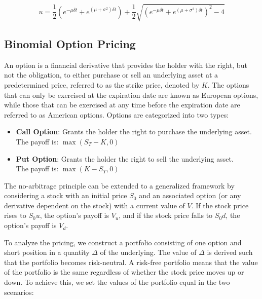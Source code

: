     \begin{equation}
        u = \frac{1}{2} \left( e^{-\mu \delta t} + e^{(\mu + \sigma^2)\delta t} \right)
            + \frac{1}{2} \sqrt{\left( e^{-\mu \delta t} + e^{(\mu + \sigma^2)\delta t} \right)^2 - 4}
        \label{eq:pw_u}
    \end{equation}

    \subsection{Binomial Option Pricing}
        \label{sec:bin_option_pricing}

    An option is a financial derivative that provides the holder with the right, but not the obligation,
    to either purchase or sell an underlying asset at a predetermined price, referred to as the strike price,
    denoted by $K$.
    The options that can only be exercised at the expiration date are known as European options,
    while those that can be exercised at any time before the expiration date are referred to as American options.
    Options are categorized into two types:
    \begin{itemize}
        \item \textbf{Call Option}: Grants the holder the right to purchase the underlying asset. \\
        The payoff is: \( \max(S_T - K, 0) \)
        \item \textbf{Put Option}: Grants the holder the right to sell the underlying asset. \\
        The payoff is: \( \max(K - S_T, 0) \)
    \end{itemize}

    The no-arbitrage principle can be extended to a generalized framework by considering a stock with an initial price
    $S_0$ and an associated option (or any derivative dependent on the stock) with a current value of $V$.
    If the stock price rises to $S_0 u$, the option's payoff is $V_u$, and if the stock price falls to $S_0 d$,
    the option's payoff is $V_d$.

    To analyze the pricing, we construct a portfolio consisting of one option and short position in a quantity $\Delta$
    of the underlying.
    The value of $\Delta$ is derived such that the portfolio becomes risk-neutral.
    A risk-free portfolio means that the value of the portfolio is the same regardless of whether
    the stock price moves up or down.
    To achieve this, we set the values of the portfolio equal in the two scenarios:


